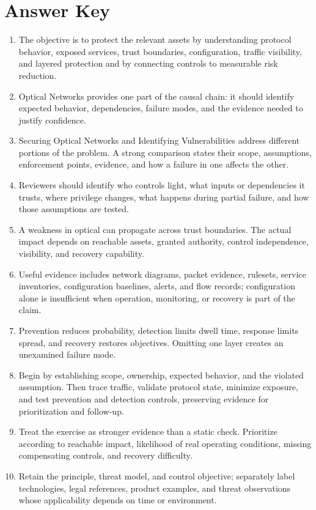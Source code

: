 \documentclass[11pt,letterpaper]{article}
\begin{document}
\section*{Answer Key}
\begin{enumerate}
\item The objective is to protect the relevant assets by understanding protocol behavior, exposed services, trust boundaries, configuration, traffic visibility, and layered protection and by connecting controls to measurable risk reduction.
\item Optical Networks provides one part of the causal chain: it should identify expected behavior, dependencies, failure modes, and the evidence needed to justify confidence.
\item Securing Optical Networks and Identifying Vulnerabilities address different portions of the problem. A strong comparison states their scope, assumptions, enforcement points, evidence, and how a failure in one affects the other.
\item Reviewers should identify who controls light, what inputs or dependencies it trusts, where privilege changes, what happens during partial failure, and how those assumptions are tested.
\item A weakness in optical can propagate across trust boundaries. The actual impact depends on reachable assets, granted authority, control independence, visibility, and recovery capability.
\item Useful evidence includes network diagrams, packet evidence, rulesets, service inventories, configuration baselines, alerts, and flow records; configuration alone is insufficient when operation, monitoring, or recovery is part of the claim.
\item Prevention reduces probability, detection limits dwell time, response limits spread, and recovery restores objectives. Omitting one layer creates an unexamined failure mode.
\item Begin by establishing scope, ownership, expected behavior, and the violated assumption. Then trace traffic, validate protocol state, minimize exposure, and test prevention and detection controls, preserving evidence for prioritization and follow-up.
\item Treat the exercise as stronger evidence than a static check. Prioritize according to reachable impact, likelihood of real operating conditions, missing compensating controls, and recovery difficulty.
\item Retain the principle, threat model, and control objective; separately label technologies, legal references, product examples, and threat observations whose applicability depends on time or environment.
\end{enumerate}
\end{document}
